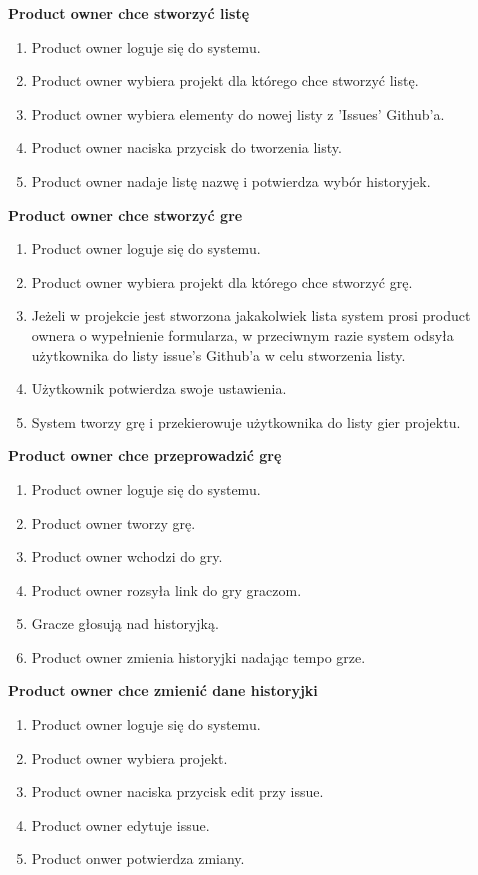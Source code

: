 \textbf{Product owner chce stworzyć listę}

\begin{enumerate}
    \item Product owner loguje się do systemu.
    \item Product owner wybiera projekt dla którego chce stworzyć listę.
    \item Product owner wybiera elementy do nowej listy z 'Issues' Github'a.
    \item Product owner naciska przycisk do tworzenia listy.
    \item Product owner nadaje listę nazwę i potwierdza wybór historyjek.
\end{enumerate}

\textbf{Product owner chce stworzyć gre}

\begin{enumerate}
    \item Product owner loguje się do systemu.
    \item Product owner wybiera projekt dla którego chce stworzyć grę.
    \item Jeżeli w projekcie jest stworzona jakakolwiek lista system prosi product ownera o wypełnienie formularza,
    w przeciwnym razie system odsyła użytkownika do listy issue's Github'a w celu stworzenia listy.
    \item Użytkownik potwierdza swoje ustawienia.
    \item System tworzy grę i przekierowuje użytkownika do listy gier projektu.
\end{enumerate}

\textbf{Product owner chce przeprowadzić grę}

\begin{enumerate}
    \item Product owner loguje się do systemu.
    \item Product owner tworzy grę.
    \item Product owner wchodzi do gry.
    \item Product owner rozsyła link do gry graczom.
    \item Gracze głosują nad historyjką.
    \item Product owner zmienia historyjki nadając tempo grze.
\end{enumerate}

\textbf{Product owner chce zmienić dane historyjki}

\begin{enumerate}
    \item Product owner loguje się do systemu.
    \item Product owner wybiera projekt.
    \item Product owner naciska przycisk edit przy issue.
    \item Product owner edytuje issue.
    \item Product onwer potwierdza zmiany.
\end{enumerate}

